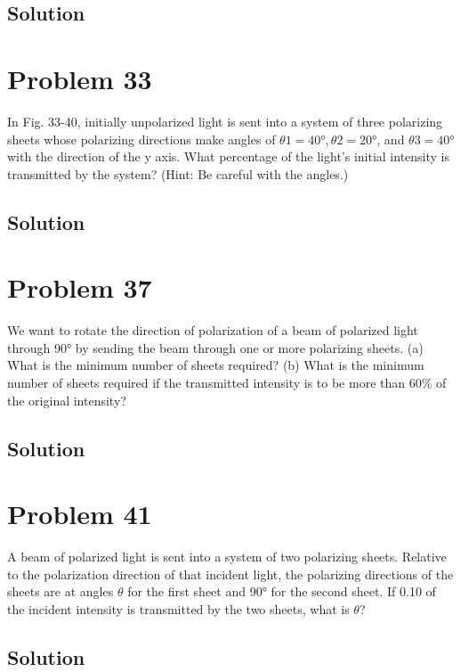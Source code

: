 \documentclass[12pt]{article}
\begin{document}
        \subsection{Solution}

    \pagebreak
    \section{Problem 33}
        In Fig. 33-40, initially unpolarized light is sent into a system of three polarizing sheets whose polarizing directions make angles of $\theta 1 = 40\unit{\degree}, \theta 2 = 20\unit{\degree}$, and $\theta 3 = 40\unit{\degree}$ with the direction of the y axis. 
        What percentage of the light's initial intensity is transmitted by the system? 
        (Hint: Be careful with the angles.)

        \subsection{Solution}

    \pagebreak
    \section{Problem 37}
        We want to rotate the direction of polarization of a beam of polarized light through 90\unit{\degree} by sending the beam through one or more polarizing sheets. 
        (a) What is the minimum number of sheets required? 
        (b) What is the minimum number of sheets required if the transmitted intensity is to be more than 60\% of the original intensity?

        \subsection{Solution}

    \pagebreak
    \section{Problem 41}
        A beam of polarized light is sent into a system of two polarizing sheets. 
        Relative to the polarization direction of that incident light, the polarizing directions of the sheets are at angles $\theta$ for the first sheet and 90\unit{\degree} for the second sheet. 
        If 0.10 of the incident intensity is transmitted by the two sheets, what is $\theta$?

        \subsection{Solution}
\end{document}

